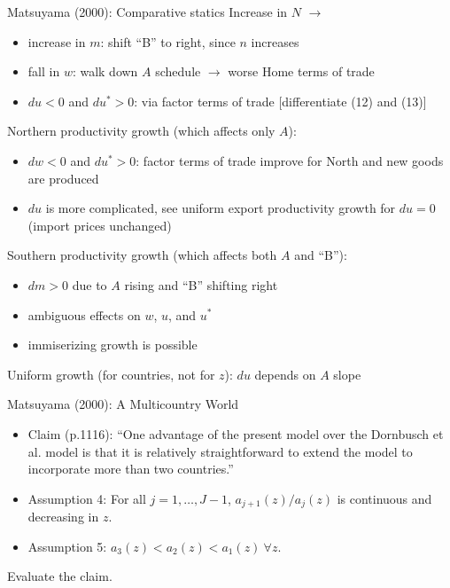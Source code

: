 \documentclass[10pt,notes=hide]{beamer}
\begin{document}
\begin{frame}{Matsuyama (2000): Comparative statics}
Increase in $N$ $\to$
\begin{itemize}
	\item increase in $m$: shift ``B'' to right, since $n$ increases
	\item fall in $w$: walk down $A$ schedule $\to$ worse Home terms of trade
	\item $du < 0$ and $du^*>0$: via factor terms of trade [differentiate (12) and (13)]
\end{itemize}
Northern productivity growth (which affects only $A$):
\begin{itemize}
	\item $dw<0$ and $du^*>0$: factor terms of trade improve for North and new goods are produced
	\item $du$ is more complicated, see uniform export productivity growth for $du=0$ (import prices unchanged)
\end{itemize}
Southern productivity growth (which affects both $A$ and ``B''):
\begin{itemize}
	\item $dm>0$ due to $A$ rising and ``B'' shifting right
	\item ambiguous effects on $w$, $u$, and $u^*$
	\item immiserizing growth is possible
\end{itemize}
Uniform growth (for countries, not for $z$): $du$ depends on $A$ slope
\end{frame}
\begin{frame}{Matsuyama (2000): A Multicountry World}
\begin{itemize}
	\item Claim (p.1116): ``One advantage of the present model over the Dornbusch et al. model is that it is relatively straightforward to extend the model to incorporate more than two countries.''
	\item Assumption 4: For all $j=1,\dots,J-1$, $a_{j+1}(z)/a_{j}(z)$ is continuous and decreasing in $z$.
	\item Assumption 5: $a_3(z)<a_2(z)<a_1(z) \ \forall z$.
\end{itemize}
Evaluate the claim.
\end{frame}
\end{document}
